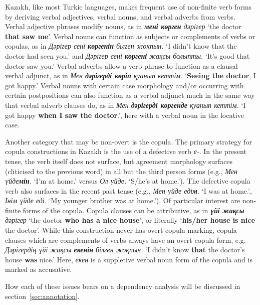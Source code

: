 \documentclass[a4paper,11pt, onecolumn,twoside]{article}
\newcommand{\kazakh}[1]{{\em #1}}
\newcommand{\gloss}[1]{`#1'}
\begin{document}
Kazakh, like most Turkic languages, makes frequent use of non-finite verb forms by deriving verbal adjectives, verbal nouns, and verbal adverbs from verbs.  Verbal adjective phrases modify nouns, as in \kazakh{\textbf{мені көрген} дәрігер} \gloss{the doctor \textbf{that saw me}}.  Verbal nouns can function as subjects or complements of verbs or copulas, as in \kazakh{Дәрігер сені \textbf{көргенін} білген жоқпын.} \gloss{I didn't know that the doctor had seen you.} and \kazakh{Дәрігер сені \textbf{көргені} жақсы болыпты.} \gloss{It's good that doctor saw you.}  Verbal adverbs allow a verb phrase to function as a clausal verbal adjunct, as in \kazakh{Мен \textbf{дәрігерді көріп} қуанып кеттім.} \gloss{\textbf{Seeing the doctor}, I got happy.}  Verbal nouns with certain case morphology and/or occurring with certain postpositions can also function as a verbal adjunct much in the same way that verbal adverb clauses do, as in \kazakh{Мен \textbf{дәрігерді көргенде} қуанып кеттім.} \gloss{I got happy \textbf{when I saw the doctor}.}, here with a verbal noun in the locative case.

Another category that may be non-overt is the copula.  The primary strategy for copula constructions in Kazakh is the use of a defective verb \kazakh{е-}.  In the present tense, the verb itself does not surface, but agreement morphology surfaces (cliticised to the previous word) in all but the third person forms (e.g., \kazakh{Мен үйде\textbf{мін}.} \gloss{I'm at home.} versus \kazakh{Ол үйде.} \gloss{S/he's at home.}).  The defective copula verb also surfaces in the recent past tense (e.g., \kazakh{Мен үйде еді\textbf{м}.} \gloss{I was at home.}, \kazakh{Інім үйде еді.} \gloss{My younger brother was at home.}).  Of particular interest are non-finite forms of the copula.  Copula clauses can be attributive, as in \kazakh{\textbf{үйі жақсы} дәрігер} \gloss{the doctor \textbf{who has a nice house}}, or literally \gloss{\textbf{his/her house is nice} the doctor}.  While this construction never has overt copula marking, copula clauses which are complements of verbs always have an overt copula form, e.g. \kazakh{Дәрігердің үйі жақсы \textbf{екенін} білген жоқпын.} \gloss{I didn't know \textbf{that} the doctor's house \textbf{was} nice.}  Here, \kazakh{екен} is a suppletive verbal noun form of the copula and is marked as accusative.


How each of these issues bears on a dependency analysis will be discussed in section~\ref{sec:annotation}.

\end{document}
